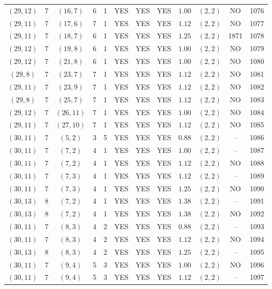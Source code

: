 \begin{longtable}{|c|c|c|c|c|c|c|c|c|c|c|c|}
$(29,12)$ & 7 & $(16,7)$ & 6 & 1 & YES & YES & YES & $1.00$ & $(2,2)$ & NO & 1076\\
$(29,11)$ & 7 & $(17,6)$ & 7 & 1 & YES & YES & YES & $1.12$ & $(2,2)$ & NO & 1077\\
$(29,11)$ & 7 & $(18,7)$ & 6 & 1 & YES & YES & YES & $1.25$ & $(2,2)$ & 1871 & 1078\\
$(29,12)$ & 7 & $(19,8)$ & 6 & 1 & YES & YES & YES & $1.00$ & $(2,2)$ & NO & 1079\\
$(29,12)$ & 7 & $(21,8)$ & 6 & 1 & YES & YES & YES & $1.00$ & $(2,2)$ & NO & 1080\\
$(29,8)$ & 7 & $(23,7)$ & 7 & 1 & YES & YES & YES & $1.12$ & $(2,2)$ & NO & 1081\\
$(29,11)$ & 7 & $(23,9)$ & 7 & 1 & YES & YES & YES & $1.12$ & $(2,2)$ & NO & 1082\\
$(29,8)$ & 7 & $(25,7)$ & 7 & 1 & YES & YES & YES & $1.12$ & $(2,2)$ & NO & 1083\\
$(29,12)$ & 7 & $(26,11)$ & 7 & 1 & YES & YES & YES & $1.00$ & $(2,2)$ & NO & 1084\\
$(29,11)$ & 7 & $(27,10)$ & 7 & 1 & YES & YES & YES & $1.12$ & $(2,2)$ & NO & 1085\\
$(30,11)$ & 7 & $(5,2)$ & 3 & 5 & YES & YES & YES & $0.88$ & $(2,2)$ & -- & 1086\\
$(30,11)$ & 7 & $(7,2)$ & 4 & 1 & YES & YES & YES & $1.00$ & $(2,2)$ & -- & 1087\\
$(30,11)$ & 7 & $(7,2)$ & 4 & 1 & YES & YES & YES & $1.12$ & $(2,2)$ & NO & 1088\\
$(30,11)$ & 7 & $(7,3)$ & 4 & 1 & YES & YES & YES & $1.12$ & $(2,2)$ & -- & 1089\\
$(30,11)$ & 7 & $(7,3)$ & 4 & 1 & YES & YES & YES & $1.25$ & $(2,2)$ & NO & 1090\\
$(30,13)$ & 8 & $(7,2)$ & 4 & 1 & YES & YES & YES & $1.38$ & $(2,2)$ & -- & 1091\\
$(30,13)$ & 8 & $(7,2)$ & 4 & 1 & YES & YES & YES & $1.38$ & $(2,2)$ & NO & 1092\\
$(30,11)$ & 7 & $(8,3)$ & 4 & 2 & YES & YES & YES & $0.88$ & $(2,2)$ & -- & 1093\\
$(30,11)$ & 7 & $(8,3)$ & 4 & 2 & YES & YES & YES & $1.12$ & $(2,2)$ & NO & 1094\\
$(30,13)$ & 8 & $(8,3)$ & 4 & 2 & YES & YES & YES & $1.25$ & $(2,2)$ & -- & 1095\\
$(30,11)$ & 7 & $(9,4)$ & 5 & 3 & YES & YES & YES & $1.00$ & $(2,2)$ & NO & 1096\\
$(30,11)$ & 7 & $(9,4)$ & 5 & 3 & YES & YES & YES & $1.12$ & $(2,2)$ & -- & 1097\\

\end{longtable}
